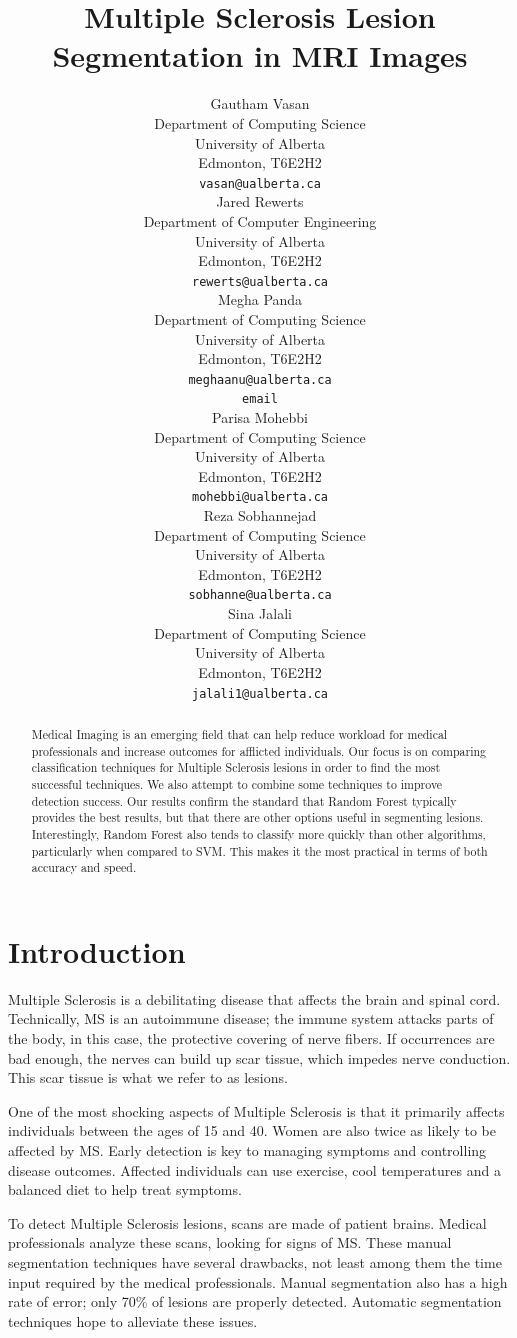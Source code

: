 \documentclass{article} %
\title{Multiple Sclerosis Lesion Segmentation in MRI Images }
\author{
Gautham Vasan \\
Department of Computing Science\\
University of Alberta\\
Edmonton, T6E2H2 \\
\texttt{vasan@ualberta.ca} \\
\And
Jared Rewerts \\
Department of Computer Engineering \\
University of Alberta \\Edmonton, T6E2H2 \\
\texttt{rewerts@ualberta.ca} \\
\And
Megha Panda \\
Department of Computing Science\\
University of Alberta \\Edmonton, T6E2H2 \\
\texttt{meghaanu@ualberta.ca} \\
\texttt{email} \\
\And
Parisa Mohebbi \\
Department of Computing Science \\
University of Alberta \\Edmonton, T6E2H2 \\
\texttt{mohebbi@ualberta.ca} \\
\And
Reza Sobhannejad \\
Department of Computing Science \\
University of Alberta \\Edmonton, T6E2H2 \\
\texttt{sobhanne@ualberta.ca} \\
\And
Sina Jalali  \\
Department of Computing Science \\
University of Alberta \\Edmonton, T6E2H2 \\
\texttt{jalali1@ualberta.ca} \\
}
\begin{document}
\maketitle
\begin{abstract}
Medical Imaging is an emerging field that can help reduce workload for medical professionals and increase outcomes for afflicted individuals. Our focus is on comparing classification techniques for Multiple Sclerosis lesions in order to find the most successful techniques. We also attempt to combine some techniques to improve detection success. Our results confirm the standard that Random Forest typically provides the best results, but that there are other options useful in segmenting lesions. Interestingly, Random Forest also tends to classify more quickly than other algorithms, particularly when compared to SVM. This makes it the most practical in terms of both accuracy and speed. 
\end{abstract}

\section{Introduction}
Multiple Sclerosis is a debilitating disease that affects the brain and spinal cord. Technically, MS is an autoimmune disease; the immune system attacks parts of the body, in this case, the protective covering of nerve fibers. If occurrences are bad enough, the nerves can build up scar tissue, which impedes nerve conduction. This scar tissue is what we refer to as lesions.

One of the most shocking aspects of Multiple Sclerosis is that it primarily affects individuals between the ages of 15 and 40. Women are also twice as likely to be affected by MS. Early detection is key to managing symptoms and controlling disease outcomes. Affected individuals can use exercise, cool temperatures and a balanced diet to help treat symptoms.

To detect Multiple Sclerosis lesions, scans are made of patient brains. Medical professionals analyze these scans, looking for signs of MS. These manual segmentation techniques have several drawbacks, not least among them the time input required by the medical professionals. Manual segmentation also has a high rate of error; only 70\% of lesions are properly detected. Automatic segmentation techniques hope to alleviate these issues. 
\end{document}
